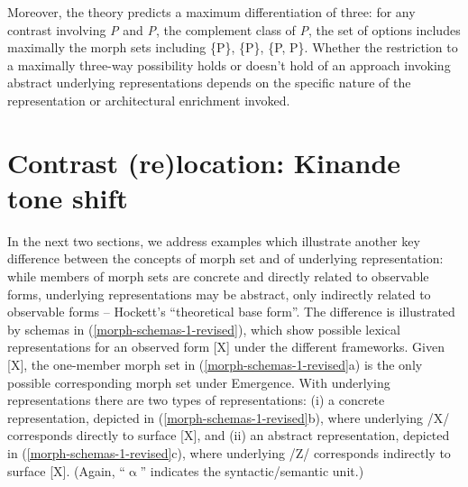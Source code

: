 Moreover,  the theory predicts a maximum differentiation of three: for any contrast involving {\it P} and {\it \up{$\wedge$}P}, the complement class of {\it P}, the set of options includes maximally the morph sets including \{P\}, \{\up{$\wedge$}P\}, \{P, \up{$\wedge$}P\}. Whether the restriction to a maximally three-way possibility holds or doesn't hold of an approach invoking abstract underlying representations depends on the specific nature of the representation or architectural enrichment invoked.

\section{Contrast (re)location: Kinande tone shift} \label{section_Kinande}\largerpage

\label{URs_Kinande_H-shift}
In the next two sections, we address examples which illustrate another  key difference between the concepts of  morph set and of underlying representation: while members of morph sets are concrete and directly related to observable forms, underlying representations may be abstract, only indirectly related to observable forms -- Hockett's ``theoretical base form''.  The difference is illustrated by schemas in (\ref{morph-schemas-1-revised}), which show possible lexical representations for an observed form [X] under the different frameworks.  Given [X], the  one-member  morph set in (\ref{morph-schemas-1-revised}a) is the only possible corresponding morph set  under Emergence. With underlying representations there are two types of representations: (i) a concrete representation, depicted in (\ref{morph-schemas-1-revised}b), where  underlying /X/  corresponds directly to surface [X], and (ii) an abstract representation, depicted in (\ref{morph-schemas-1-revised}c),  where underlying /Z/ corresponds indirectly to  surface [X]. (Again, ``$\upalpha$'' indicates the syntactic/semantic unit.)

